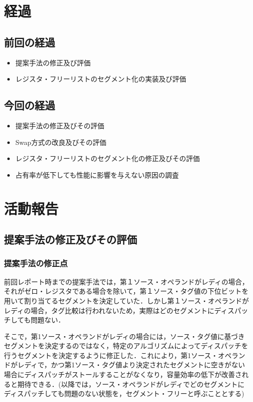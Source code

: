\documentclass[twocolumn]{jsarticle}
\begin{document}
  \section{経過}

  \subsection{前回の経過}
  \begin{itemize}
    \item 提案手法の修正及び評価
    \item レジスタ・フリーリストのセグメント化の実装及び評価
  \end{itemize}
  
  \subsection{今回の経過}
  \begin{itemize}
  \item 提案手法の修正及びその評価
  \item Swap方式の改良及びその評価
  \item レジスタ・フリーリストのセグメント化の修正及びその評価
  \item 占有率が低下しても性能に影響を与えない原因の調査
  \end{itemize}

  \section{活動報告}
  \subsection{提案手法の修正及びその評価}
  \subsubsection{提案手法の修正点}
  前回レポート時までの提案手法では，第１ソース・オペランドがレディの場合，それがゼロ・レジスタである場合を除いて，第１ソース・タグ値の下位ビットを用いて割り当てるセグメントを決定していた．しかし第１ソース・オペランドがレディの場合，タグ比較は行われないため，実際はどのセグメントにディスパッチしても問題ない．
  
  そこで，第1ソース・オペランドがレディの場合には，ソース・タグ値に基づきセグメントを決定するのではなく，特定のアルゴリズムによってディスパッチを行うセグメントを決定するように修正した．これにより，第1ソース・オペランドがレディで，かつ第1ソース・タグ値より決定されたセグメントに空きがない場合にディスパッチがストールすることがなくなり，容量効率の低下が改善されると期待できる．(以降では，ソース・オペランドがレディでどのセグメントにディスパッチしても問題のない状態を，セグメント・フリーと呼ぶこととする)
  
\end{document}
